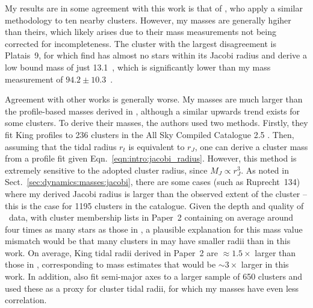 My results are in some agreement with this work is that of \cite{meingast_extended_2021}, who apply a similar methodology to ten nearby clusters. However, my masses are generally hgiher than theirs, which likely arises due to their mass measurements not being corrected for incompleteness. The cluster with the largest disagreement is Platais~9, for which \cite{meingast_extended_2021} find has almost no stars within its Jacobi radius and derive a low bound mass of just 13.1~\MSun, which is significantly lower than my mass measurement of $94.2 \pm 10.3$~\MSun.

Agreement with other works is generally worse. My masses are much larger than the profile-based masses derived in \cite{piskunov_tidal_2008}, although a similar upwards trend exists for some clusters. To derive their masses, the authors used two methods. Firstly, they fit King profiles to 236 clusters in the All Sky Compiled Catalogue 2.5 \cite{kharchenko_allsky_compiled_2001}. Then, assuming that the \cite{king_structure_star_1962} tidal radius $r_t$ is equivalent to $r_J$, one can derive a cluster mass from a profile fit given Eqn.~\ref{eqn:intro:jacobi_radius}. However, this method is extremely sensitive to the adopted cluster radius, since $M_J \propto r_J^3$. As noted in Sect.~\ref{sec:dynamics:masses:jacobi}, there are some cases (such as Ruprecht~134) where my derived Jacobi radius is larger than the observed extent of the cluster -- this is the case for 1195 clusters in the catalogue. Given the depth and quality of \gaia\ data, with cluster membership lists in Paper~2 containing on average around four times as many stars as those in \cite{kharchenko_global_2013}, a plausible explanation for this mass value mismatch would be that many clusters in \cite{piskunov_tidal_2008} may have smaller radii than in this work. On average, King tidal radii derived in Paper~2 are $\approx 1.5\times$ larger than those in \cite{piskunov_tidal_2008}, corresponding to mass estimates that would be $\sim 3\times$ larger in this work. In addition, \cite{piskunov_tidal_2008} also fit semi-major axes to a larger sample of 650 clusters and used these as a proxy for cluster tidal radii, for which my masses have even less correlation.

